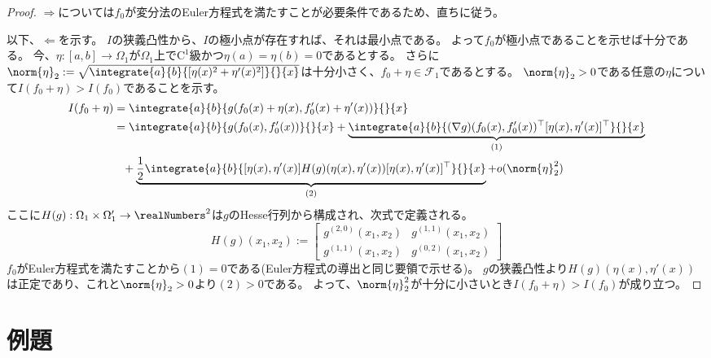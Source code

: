             \begin{proof}
                \quad\par
                $\Rightarrow$については$f_0$が変分法のEuler方程式を満たすことが必要条件であるため、直ちに従う。
                \par
                以下、$\Leftarrow$を示す。
                $I$の狭義凸性から、$I$の極小点が存在すれば、それは最小点である。
                よって$f_0$が極小点であることを示せば十分である。
                今、$\eta:[a,b]\to\Omega_1$が$\Omega_1$上で$\mathrm{C}^1$級かつ$\eta(a)=\eta(b)=0$であるとする。
                さらに$\norm{\eta}_2 := \sqrt{\integrate{a}{b}{[\eta(x)^2+\eta'(x)^2]}{}{x}}$は十分小さく、$f_0+\eta\in\mathcal{F}_1$であるとする。
                $\norm{\eta}_2>0$である任意の$\eta$について$I(f_0+\eta) > I(f_0)$であることを示す。
                \begin{align*}
                    I(f_0+\eta) &= \integrate{a}{b}{g(f_0(x)+\eta(x),f_0'(x)+\eta'(x))}{}{x} \\
                    &= \integrate{a}{b}{g(f_0(x),f_0'(x))}{}{x} + \underbrace{\integrate{a}{b}{(\nabla g)(f_0(x),f_0'(x))^\top[\eta(x),\eta'(x)]^\top}{}{x}}_{(1)} \\
                    &\phantom{=} + \underbrace{\frac{1}{2}\integrate{a}{b}{[\eta(x),\eta'(x)]H(g)(\eta(x),\eta'(x))[\eta(x),\eta'(x)]^\top}{}{x}}_{(2)} + o(\norm{\eta}_2^2)
                \end{align*}
                ここに$H(g):\Omega_1\times\Omega_1'\to\realNumbers^2$は$g$のHesse行列から構成され、次式で定義される。
                \[
                    H(g)(x_1,x_2) :=
                    \begin{bmatrix}
                        g^{(2,0)}(x_1,x_2) & g^{(1,1)}(x_1,x_2) \\
                        g^{(1,1)}(x_1,x_2) & g^{(0,2)}(x_1,x_2)
                    \end{bmatrix}
                \]
                $f_0$がEuler方程式を満たすことから$(1)=0$である(Euler方程式の導出と同じ要領で示せる)。
                $g$の狭義凸性より$H(g)(\eta(x),\eta'(x))$は正定であり、これと$\norm{\eta}_2>0$より$(2)>0$である。
                よって、$\norm{\eta}_2^2$が十分に小さいとき$I(f_0+\eta) > I(f_0)$が成り立つ。
            \end{proof}
    \section{例題}
